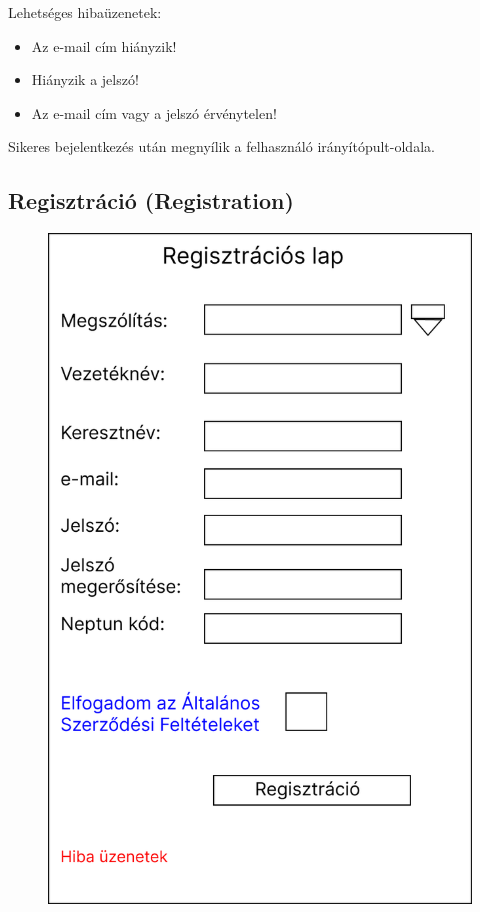 \documentclass[a4paper,12pt]{article}
\begin{document}
Lehetséges hibaüzenetek:
\begin{itemize}
	\item Az e-mail cím hiányzik!
	\item Hiányzik a jelszó!
	\item Az e-mail cím vagy a jelszó érvénytelen!
\end{itemize}

Sikeres bejelentkezés után megnyílik a felhasználó irányítópult-oldala.

\subsection{Regisztráció (Registration)}

\begin{figure}
	\centering
	\includegraphics[width=\textwidth]{images/Web_pages/Registration.jpg}
	\caption{}
	\label{fig:Registration}
\end{figure}
\end{document}
